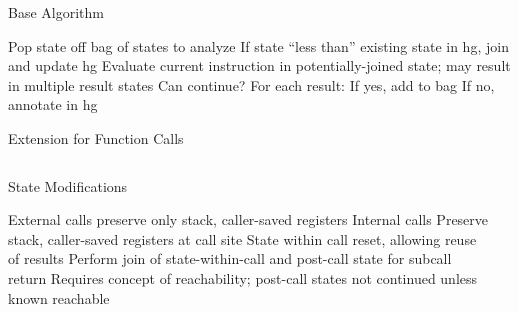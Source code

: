 %
%
%

\begin{frame}{Base Algorithm}
  \begin{outline}[enumerate]
    \1 Pop state off \gls{bag} of states to analyze
    \1 If state \alert{``less than''} existing state in \gls{hg}, join and update \gls{hg}
    \1 Evaluate current instruction in potentially-joined state; may result in multiple result states
    \1 Can continue? For each result:
      \2 If yes, add to bag
      \2 If no, annotate in \gls{hg}
  \end{outline}
\end{frame}

\begin{frame}{Extension for Function Calls}
  \begin{columns}
    \begin{block}{State Modifications}
      \begin{outline}
        \1 External calls preserve only stack, \alert{caller-saved} registers
        \1 Internal calls
          \2 Preserve stack, \alert{caller-saved} registers at call site
          \2 State within call reset, allowing reuse of results
          \2 Perform join of state-within-call and post-call state for subcall return
        \1 Requires concept of \alert{reachability}; post-call states not continued unless known reachable
      \end{outline}
    \end{block}

    \begin{example}
    \end{example}
  \end{columns}
\end{frame}

